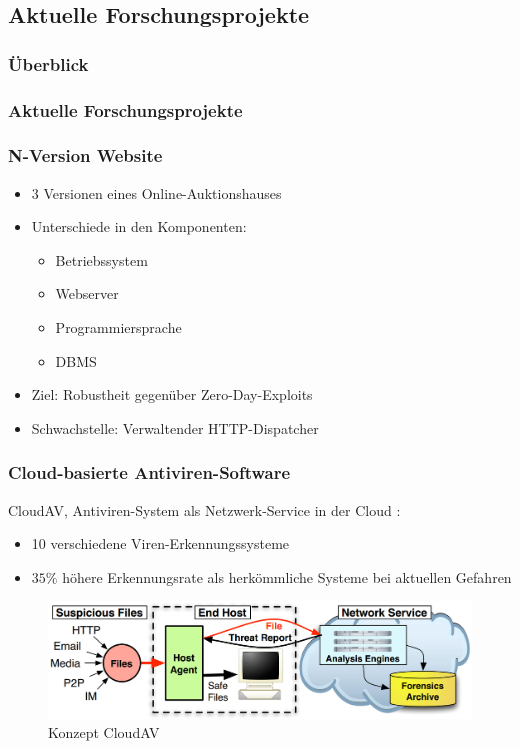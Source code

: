 \subsection{Aktuelle Forschungsprojekte}
%
%
\begin{frame}
	\frametitle{Überblick}
	\tableofcontents[currentsubsection]
\end{frame}
%
\begin{frame}
	\frametitle{Aktuelle Forschungsprojekte}
	
	
\end{frame}
%
%
\begin{frame}
	\frametitle{N-Version Website}
	
	\begin{itemize}
		\item 3 Versionen eines Online-Auktionshauses \cite{zero-day}
		\item Unterschiede in den Komponenten:
		\begin{itemize}
			\item Betriebssystem
			\item Webserver
			\item Programmiersprache
			\item DBMS
		\end{itemize}
		\item Ziel: Robustheit gegenüber Zero-Day-Exploits
		\item Schwachstelle: Verwaltender HTTP-Dispatcher
		
	\end{itemize}
	
\end{frame}
%
%
\begin{frame}
	\frametitle{Cloud-basierte Antiviren-Software}
	
	CloudAV, Antiviren-System als Netzwerk-Service in der Cloud \cite{Oberheide:2008:CNA:1496711.1496718}: 
	\begin{itemize}
		\item 10 verschiedene Viren-Erkennungssysteme
		\item $35\%$ höhere Erkennungsrate als herkömmliche Systeme bei aktuellen Gefahren
	\end{itemize}
	\pause
	\begin{figure}
		\includegraphics[scale=0.2]{grafiken/antivir.png}		
		\caption{Konzept CloudAV
			\footnotemark		
		}		
	\end{figure}
\end{frame}
%

